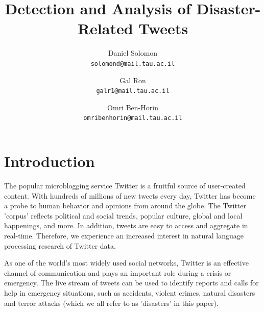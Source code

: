 \documentclass[letterpaper,twocolumn,10pt]{article}
\begin{document}
\date{}

\title{\Large \bf Detection and Analysis of Disaster-Related Tweets}

\author{
{\rm Daniel Solomon}\\
\texttt{solomond@mail.tau.ac.il}
\and
{\rm Gal Ron}\\
\texttt{galr1@mail.tau.ac.il‬}
\and
{\rm Omri Ben-Horin}\\
\texttt{omribenhorin@mail.tau.ac.il}
}

\maketitle

\thispagestyle{empty}


\abstract{}

\begin{center}
	\parbox{200pt}{
	}
\end{center}

\section{Introduction}
The popular microblogging service Twitter is a fruitful source of user-created content. With hundreds of millions of new tweets every day, Twitter has become a probe to human behavior and opinions from around the globe. The Twitter 'corpus' reflects political and social trends, popular culture, global and local happenings, and more. In addition, tweets are easy to access and aggregate in real-time. Therefore, we experience an increased interest in natural language processing research of Twitter data.

As one of the world's most widely used social networks, Twitter is an effective channel of communication and plays an important role during a crisis or emergency. The live stream of tweets can be used to identify reports and calls for help in emergency situations, such as accidents, violent crimes, natural disasters and terror attacks (which we all refer to as 'disasters' in this paper).
\end{document}

